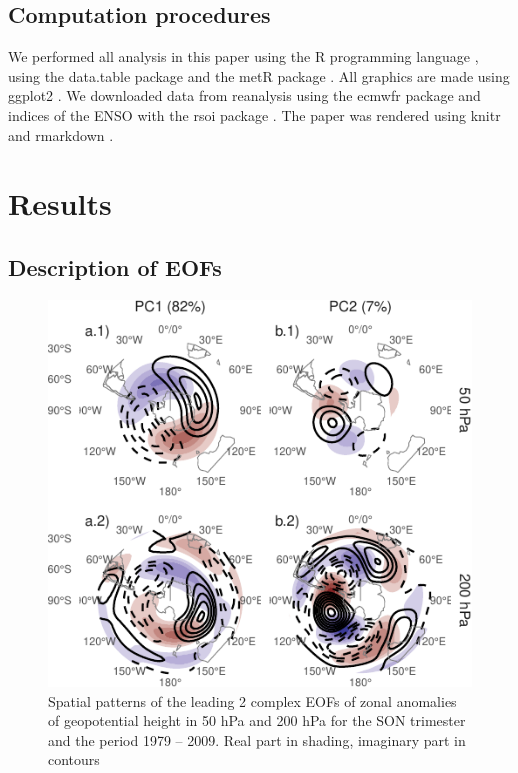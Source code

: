 \documentclass[smallextended]{svjour3}       %
\begin{document}
\hypertarget{computation-procedures}{%
\subsection{Computation procedures}\label{computation-procedures}}

We performed all analysis in this paper using the R programming language \citep{rcoreteam2020}, using the data.table package \citep{dowle2020} and the metR package \citep{campitelli2020}. All graphics are made using ggplot2 \citep{wickham2009}. We downloaded data from reanalysis using the ecmwfr package \citep{hufkens2020} and indices of the ENSO with the rsoi package \citep{albers2020}. The paper was rendered using knitr and rmarkdown \citep{xie2015, allaire2019}.

\hypertarget{results}{%
\section{Results}\label{results}}

\hypertarget{description-of-eofs}{%
\subsection{Description of EOFs}\label{description-of-eofs}}

\begin{figure}
\centering
\includegraphics{../figures/ceofs-1-1.pdf}
\caption{\label{fig:ceofs-1}Spatial patterns of the leading 2 complex EOFs of zonal anomalies of geopotential height in 50 hPa and 200 hPa for the SON trimester and the period 1979 -- 2009. Real part in shading, imaginary part in contours}
\end{figure}
\end{document}
